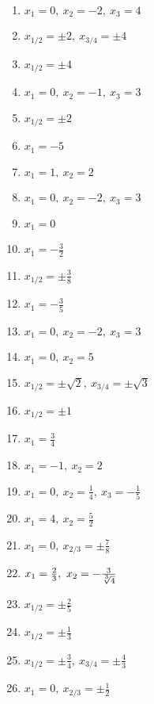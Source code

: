 \newpage
\begin{Answer}[ref=ganzNSTA1]
	
	\begin{minipage}{\textwidth}
		\begin{minipage}{0.5\textwidth}
			\begin{enumerate}[label=\alph*)]
				\item \(x_1=0,\ x_2=-2,\ x_3=4\)
				\item \(x_{1/2}=\pm 2,\ x_{3/4}=\pm 4\)
				\item \(x_{1/2}=\pm 4\)
				\item \(x_1=0,\ x_2=-1,\ x_3=3\)
				\item \(x_{1/2}=\pm 2\)
				\item \(x_1=-5\)
				\item \(x_1=1,\ x_2=2\)
				\item \(x_1=0,\ x_2=-2,\ x_3=3\)
				\item \(x_1=0\)
				\item \(x_1=-\frac{3}{2}\)
				\item \(x_{1/2}=\pm \frac{3}{8}\)
				\item \(x_1=-\frac{3}{5}\)
				\item \(x_1=0,\ x_2=-2,\ x_3=3\)
			\end{enumerate}
		\end{minipage}%
		\begin{minipage}{0.5\textwidth}
			\begin{enumerate}[label=\alph*)]
				\setcounter{enumi}{13}
				\item \(x_1=0,\ x_2=5\)
				\item \(x_{1/2}=\pm \sqrt{2},\ x_{3/4}=\pm \sqrt{3}\)
				\item \(x_{1/2}=\pm 1\)
				\item \(x_1=\frac{3}{4}\)
				\item \(x_1=-1,\ x_2=2\)
				\item \(x_1=0,\ x_2=\frac{1}{4},\ x_3=-\frac{1}{5}\)
				\item \(x_1=4,\ x_2=\frac{5}{2}\)
				\item \(x_1=0,\ x_{2/3}=\pm \frac{7}{8}\)
				\item \(x_1=\frac{2}{3},\ x_2=-\frac{3}{\sqrt[\leftroot{0}\uproot{2}3]{4}}\)
				\item \(x_{1/2}=\pm\frac{2}{5}\)
				\item \(x_{1/2}=\pm\frac{1}{3}\)
				\item \(x_{1/2}=\pm\frac{3}{4},\ x_{3/4}=\pm\frac{4}{3}\)
				\item \(x_1=0,\ x_{2/3}=\pm\frac{1}{2}\)
			\end{enumerate}
		\end{minipage}%
	\end{minipage}
\end{Answer}